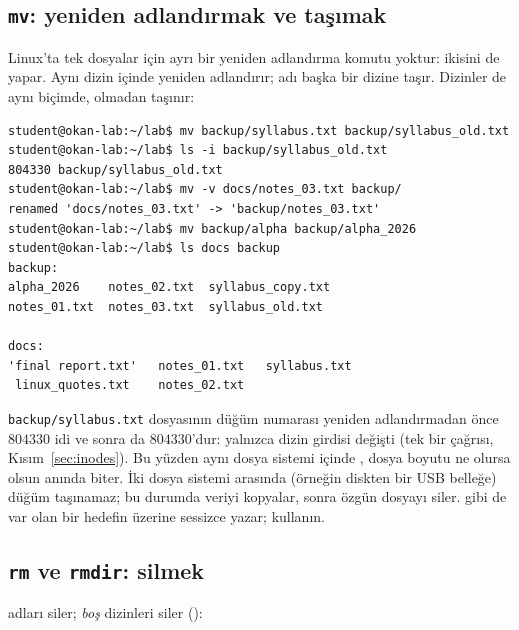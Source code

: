 \subsection{\texttt{mv}: yeniden adlandırmak ve taşımak}

Linux'ta tek dosyalar için ayrı bir yeniden adlandırma komutu yoktur:  ikisini de yapar. Aynı dizin içinde  yeniden adlandırır;  adı başka bir dizine taşır. Dizinler de aynı biçimde,  olmadan taşınır:

\begin{lstlisting}[style=term]
student@okan-lab:~/lab$ mv backup/syllabus.txt backup/syllabus_old.txt
student@okan-lab:~/lab$ ls -i backup/syllabus_old.txt
804330 backup/syllabus_old.txt
student@okan-lab:~/lab$ mv -v docs/notes_03.txt backup/
renamed 'docs/notes_03.txt' -> 'backup/notes_03.txt'
student@okan-lab:~/lab$ mv backup/alpha backup/alpha_2026
student@okan-lab:~/lab$ ls docs backup
backup:
alpha_2026    notes_02.txt  syllabus_copy.txt
notes_01.txt  notes_03.txt  syllabus_old.txt

docs:
'final report.txt'   notes_01.txt   syllabus.txt
 linux_quotes.txt    notes_02.txt
\end{lstlisting}

\texttt{backup/syllabus.txt} dosyasının düğüm numarası yeniden adlandırmadan önce $804330$ idi ve sonra da $804330$'dur: yalnızca dizin girdisi değişti (tek bir  çağrısı, Kısım~\ref{sec:inodes}). Bu yüzden aynı dosya sistemi içinde , dosya boyutu ne olursa olsun anında biter. İki dosya sistemi arasında (örneğin diskten bir USB belleğe) düğüm taşınamaz; bu durumda  veriyi kopyalar, sonra özgün dosyayı siler.  gibi  de var olan bir hedefin üzerine sessizce yazar;  kullanın.

\subsection{\texttt{rm} ve \texttt{rmdir}: silmek}

 adları siler;  \emph{boş} dizinleri siler ():

